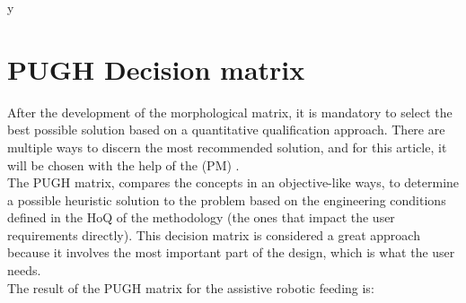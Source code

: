 \documentclass[11pt]{report} %
\begin{document}
y
\section{PUGH Decision matrix}

After the development of the morphological matrix, it is mandatory to select the best possible solution based on a quantitative qualification approach. There are multiple ways to discern the most recommended solution, and for this article, it will be chosen with the help of the  (PM) \citep{cite_pugh_matrix}.\\

The PUGH matrix, compares the concepts in an objective-like ways, to determine a possible heuristic solution to the problem based on the engineering conditions defined in the HoQ of the methodology (the ones that impact the user requirements directly). This decision matrix is considered a great approach because it involves the most important part of the design, which is what the user needs.\\

The result of the PUGH matrix for the assistive robotic feeding is:\\
\end{document}
